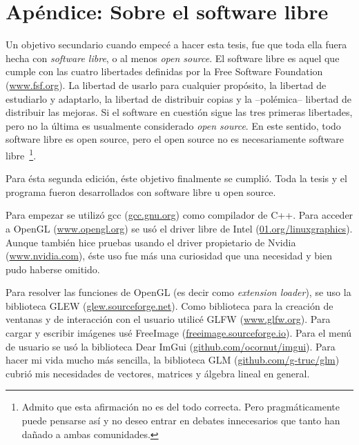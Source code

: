 \chapter*{Apéndice: Sobre el software libre}
\label{sec:apendice}

Un objetivo secundario cuando empecé a hacer esta tesis, fue que toda ella fuera hecha con \emph{software libre}, o al menos \emph{open source}.
El software libre es aquel que cumple con las cuatro libertades definidas por la Free Software Foundation (\href{https://www.fsf.org}{www.fsf.org}).
La libertad de usarlo para cualquier propósito, la libertad de estudiarlo y adaptarlo, la libertad de distribuir copias y la --polémica-- libertad de distribuir las mejoras.
Si el software en cuestión sigue las tres primeras libertades, pero no la última es usualmente considerado \emph{open source}.
En este sentido, todo software libre es open source, pero el open source no es necesariamente software  libre~\footnote{Admito que esta afirmación no es del todo correcta. Pero pragmáticamente puede pensarse así y no deseo entrar en debates innecesarios que tanto han dañado a ambas comunidades.}.

Para ésta segunda edición, éste objetivo finalmente se cumplió. Toda la tesis y el programa fueron desarrollados con software libre u open source.

Para empezar se utilizó gcc (\href{http://gcc.gnu.org/}{gcc.gnu.org}) como compilador de C++.
Para acceder a OpenGL (\href{https://www.opengl.org/}{www.opengl.org}) se usó el driver libre de Intel (\href{https://01.org/linuxgraphics}{01.org/linuxgraphics}).
Aunque también hice pruebas usando el driver propietario de Nvidia (\href{https://www.nvidia.com}{www.nvidia.com}), éste uso fue más una curiosidad que una necesidad y bien pudo haberse omitido.

Para resolver las funciones de OpenGL (es decir como \emph{\textenglish{extension loader}}), se uso la biblioteca GLEW (\href{http://glew.sourceforge.net/}{glew.sourceforge.net}).
Como biblioteca para la creación de ventanas y de interacción con el usuario utilicé GLFW (\href{https://www.glfw.org/}{www.glfw.org}).
Para cargar y escribir imágenes usé FreeImage (\href{https://freeimage.sourceforge.io/}{freeimage.sourceforge.io}).
Para el menú de usuario se usó la biblioteca Dear ImGui (\href{https://github.com/ocornut/imgui}{github.com/ocornut/imgui}).
Para hacer mi vida mucho más sencilla, la biblioteca GLM (\href{https://github.com/g-truc/glm}{github.com/g-truc/glm}) cubrió mis necesidades de vectores, matrices y álgebra lineal en general.

